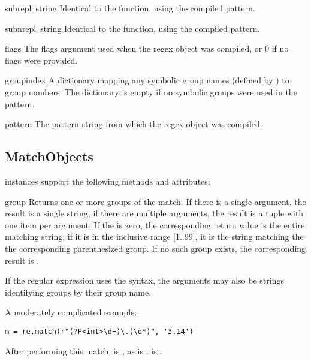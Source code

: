 \begin{funcdesc}{sub}{repl\, string}
Identical to the  function, using the compiled pattern.
\end{funcdesc}

\begin{funcdesc}{subn}{repl\, string}
Identical to the  function, using the compiled pattern.
\end{funcdesc}

\renewcommand{\indexsubitem}{(regex attribute)}

\begin{datadesc}{flags}
The flags argument used when the regex object was compiled, or 0 if no
flags were provided.
\end{datadesc}

\begin{datadesc}{groupindex}
A dictionary mapping any symbolic group names (defined by 
) to group numbers.  The dictionary is empty if no
symbolic groups were used in the pattern.
\end{datadesc}

\begin{datadesc}{pattern}
The pattern string from which the regex object was compiled.
\end{datadesc}

\subsection{MatchObjects}
 instances support the following methods and attributes:

\begin{funcdesc}{group}{}
Returns one or more groups of the match.  If there is a single
 argument, the result is a single string; if there are
multiple arguments, the result is a tuple with one item per argument.
If the  is zero, the corresponding return value is the
entire matching string; if it is in the inclusive range [1..99], it is
the string matching the the corresponding parenthesized group.  If no
such group exists, the corresponding result is
.

If the regular expression uses the  syntax,
the  arguments may also be strings identifying groups by
their group name.

A moderately complicated example:
\bcode\begin{verbatim}
m = re.match(r"(?P<int>\d+)\.(\d*)", '3.14')
\end{verbatim}\ecode
%
After performing this match,  is , as is .
 is .
\end{funcdesc}

